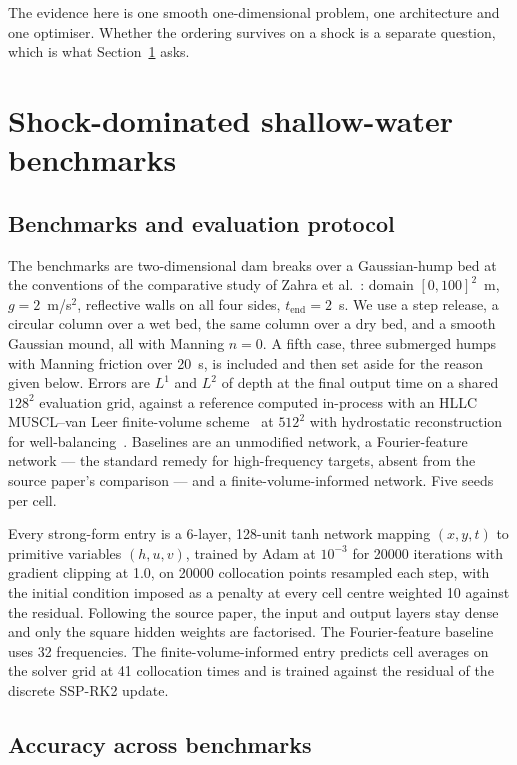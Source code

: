 \documentclass[11pt]{article}
\begin{document}
The evidence here is one smooth one-dimensional problem, one architecture and
one optimiser. Whether the ordering survives on a shock is a separate
question, which is what Section~\ref{sec:swe} asks.

\section{Shock-dominated shallow-water benchmarks}
\label{sec:swe}

\subsection{Benchmarks and evaluation protocol}

The benchmarks are two-dimensional dam breaks over a Gaussian-hump bed at the
conventions of the comparative study of Zahra
et al.~\cite{dambreak2026comparative}: domain $[0,100]^2$~m,
$g = 2$~m/s$^2$, reflective walls on all four sides, $t_{\text{end}} = 2$~s.
We use a step release, a circular column over a wet bed, the same column over
a dry bed, and a smooth Gaussian mound, all with Manning $n = 0$. A fifth
case, three submerged humps with Manning friction over 20~s, is included and
then set aside for the reason given below. Errors are
$L^1$ and $L^2$ of depth at the final output time on a shared $128^2$
evaluation grid, against a reference computed in-process with an HLLC
MUSCL--van Leer finite-volume scheme~\cite{toro2009riemann} at $512^2$ with
hydrostatic reconstruction for well-balancing~\cite{audusse2004wellbalanced}.
Baselines are an unmodified network, a Fourier-feature network --- the
standard remedy for high-frequency targets, absent from the source paper's
comparison --- and a finite-volume-informed network. Five seeds per cell.

Every strong-form entry is a 6-layer, 128-unit tanh network mapping
$(x,y,t)$ to primitive variables $(h,u,v)$, trained by Adam at $10^{-3}$ for
20000 iterations with gradient clipping at 1.0, on 20000 collocation points
resampled each step, with the initial condition imposed as a penalty at every
cell centre weighted 10 against the residual. Following the source paper, the
input and output layers stay dense and only the square hidden weights are
factorised. The Fourier-feature baseline uses 32 frequencies. The
finite-volume-informed entry predicts cell averages on the solver grid at 41
collocation times and is trained against the residual of the discrete SSP-RK2
update.

\subsection{Accuracy across benchmarks}
\end{document}
